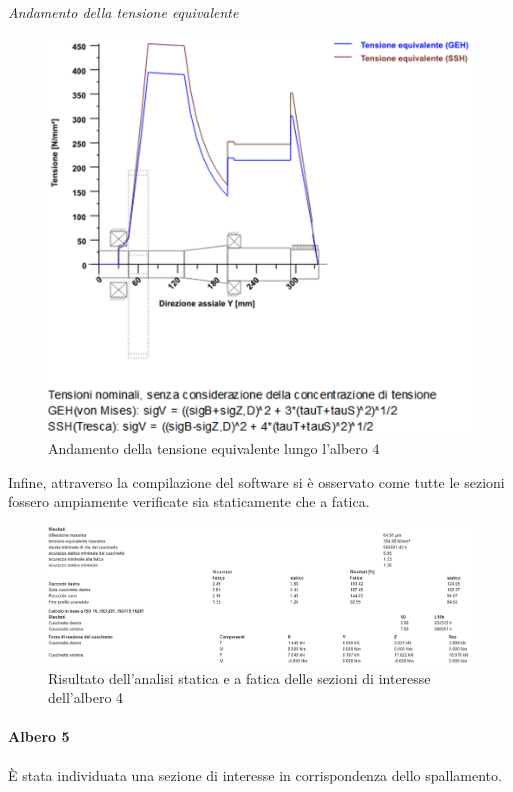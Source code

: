 \emph{Andamento della tensione equivalente}
\begin{figure}[h]
    \centering
    \includegraphics[scale=0.45]{Immagini/TensioniAlbero4.png}
    \caption{Andamento della tensione equivalente lungo l'albero 4}
    \label{fig:TensioniAlbero4}
\end{figure}
\newpage
Infine, attraverso la compilazione del software si è osservato come tutte le sezioni fossero ampiamente verificate sia staticamente che a fatica.
\begin{figure}[h]
    \centering
       \includegraphics[scale=0.5]{Immagini/RisultatiAlbero4.png}
    \caption{Risultato dell'analisi statica e a fatica delle sezioni di interesse dell'albero 4}
    \label{fig:RisultatiALbero4}
\end{figure}

\paragraph{Albero 5}
È stata individuata una sezione di interesse in corrispondenza dello spallamento. 

